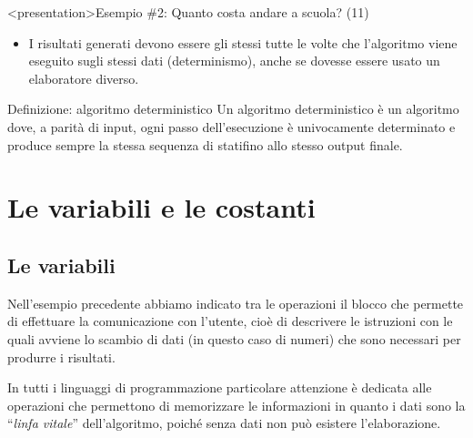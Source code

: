 \documentclass[
    notheorems,
    11pt,
    compress,
    aspectratio=169
]{beamer}
\begin{document}
\begin{frame}<presentation>{Esempio \#2: Quanto costa andare a scuola? (11)}
    \begin{itemize}
        \item I risultati generati devono essere gli stessi tutte le volte che l'algoritmo viene eseguito sugli stessi dati (determinismo), anche se dovesse essere usato un elaboratore diverso.
    \end{itemize}

    \pause
    \vspace{\baselineskip}

    \begin{block}{Definizione: algoritmo deterministico}
        Un algoritmo deterministico è un algoritmo dove, a parità di input, ogni passo dell’esecuzione è univocamente determinato e produce sempre la stessa sequenza di stati\footnotemark[1] fino allo stesso output finale.
    \end{block}

\end{frame}


\section{Le variabili e le costanti}

\subsection{Le variabili}

\begin{frame}

    Nell’esempio precedente abbiamo indicato tra le operazioni il blocco che permette di effettuare la comunicazione con l’utente, cioè di descrivere le istruzioni con le quali avviene lo scambio di dati (in questo caso di numeri) che sono necessari per produrre i risultati.

    \pause
    \vspace{\baselineskip}

    In tutti i linguaggi di programmazione particolare attenzione è dedicata alle operazioni che permettono di memorizzare le informazioni in quanto i dati sono la “\textit{linfa vitale}” dell’algoritmo, poiché senza dati non può esistere l’elaborazione.
\end{frame}
\end{document}
